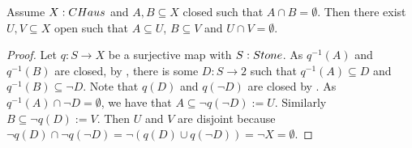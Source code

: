 \begin{lemma}\label{CHausSeperationOfClosedByOpens}
 Assume $X:\CHaus$ and $A,B\subseteq X$ closed such that $A\cap B=\emptyset$. 
  Then there exist $U,V\subseteq X$ open such that $A\subseteq U$, $B\subseteq V$ and $U\cap V=\emptyset$. 
\end{lemma}
\begin{proof}
  Let $q:S\to X$ be a surjective map with $S:\Stone$.
  As $q^{-1}(A)$ and $q^{-1}(B)$ are closed, 
  by , there is some $D:S \to 2$ such that
  $q^{-1}(A) \subseteq D$ and $q^{-1}(B) \subseteq \neg D$. 
  Note that $q(D)$ and $q(\neg D)$ are closed by . 
  As $q^{-1}(A) \cap \neg D  =\emptyset$, we have that 
  $A\subseteq \neg q(\neg D):=U$. 
  Similarly $B\subseteq \neg q(D):=V$. 
  Then $U$ and $V$ are disjoint because $\neg q(D)\cap \neg q(\neg D) = \neg (q(D)\cup q(\neg D)) = \neg X = \emptyset$.
\end{proof}

